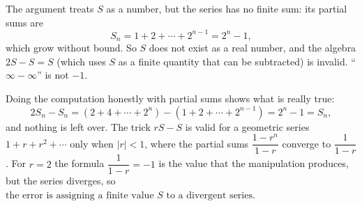 The argument treats $S$ as a number, but the series has no finite sum: its partial sums are
\[
S_n=1+2+\cdots+2^{n-1}=2^n-1,
\]
which grow without bound. So $S$ does not exist as a real number, and the algebra $2S-S=S$ (which uses $S$ as a finite quantity that can be subtracted) is invalid. ``$\infty-\infty$'' is not $-1$.

Doing the computation honestly with partial sums shows what is really true:
\[
2S_n-S_n=(2+4+\cdots+2^n)-(1+2+\cdots+2^{n-1})=2^n-1=S_n,
\]
and nothing is left over. The trick $rS-S$ is valid for a geometric series $1+r+r^2+\cdots$ only when $|r|<1$, where the partial sums $\dfrac{1-r^n}{1-r}$ converge to $\dfrac{1}{1-r}$. For $r=2$ the formula $\dfrac{1}{1-r}=-1$ is the value that the manipulation produces, but the series diverges, so $\boxed{\text{the error is assigning a finite value }S\text{ to a divergent series}}$.
